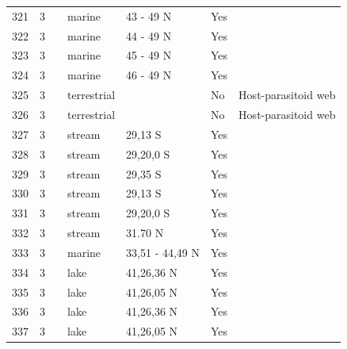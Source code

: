 \documentclass[12pt]{article}
\begin{document}
\begin{landscape}
\begin{table}[h!]
{\begin{tabular}{p{2.8cm}p{1.3cm}p{5.5cm}p{2.2cm}p{2.5cm}lp{3.5cm}}
        321   & 3 & \citet{Ruzicka2012}    & marine & 43 - 49 N & Yes   &       \\
        322   & 3 & \citet{Ruzicka2012}    & marine & 44 - 49 N & Yes   &       \\
        323   & 3 & \citet{Ruzicka2012}    & marine & 45 - 49 N & Yes   &       \\
        324   & 3 & \citet{Ruzicka2012}    & marine & 46 - 49 N & Yes   &       \\
        325   & 3 & \citet{Lewis2002}  & terrestrial &       & No    & Host-parasitoid web \\
        326   & 3 & \citet{Lewis2002}  & terrestrial &       & No    & Host-parasitoid web \\
        327   & 3 & \citet{Kelleway2010}  & stream & 29,13 S & Yes   &       \\
        328   & 3 & \citet{Kelleway2010}  & stream & 29,20,0 S & Yes   &       \\
        329   & 3 & \citet{Kelleway2010}  & stream & 29,35 S & Yes   &       \\
        330   & 3 & \citet{Kelleway2010}  & stream & 29,13 S & Yes   &       \\
        331   & 3 & \citet{Kelleway2010}  & stream & 29,20,0 S & Yes   &       \\
        332   & 3 & \citet{Huang2008}  & stream & 31.70 N & Yes   &       \\
        333   & 3 & \citet{Link2002}    & marine & 33,51 - 44,49 N & Yes   &       \\
        334   & 3 & \citet{Alcorlo2001}  & lake  & 41,26,36 N & Yes   &       \\
        335   & 3 & \citet{Alcorlo2001}  & lake  & 41,26,05 N & Yes   &       \\
        336   & 3 & \citet{Alcorlo2001}  & lake  & 41,26,36 N & Yes   &       \\
        337   & 3 & \citet{Alcorlo2001}  & lake  & 41,26,05 N & Yes   &       \\
         \hline
      \end{tabular}}%
      \end{table}

        \newpage


\end{landscape}
\end{document}
